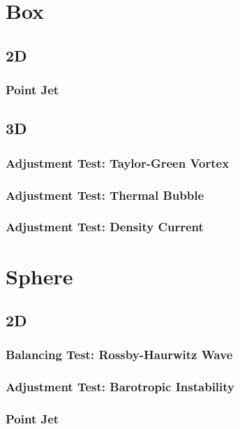 \documentclass{report}
\begin{document}
\section{Box}

\subsection{2D}

\subsubsection{Point Jet}

\subsection{3D}

\subsubsection{Adjustment Test: Taylor-Green Vortex}
\subsubsection{Adjustment Test: Thermal Bubble}
\subsubsection{Adjustment Test: Density Current}

\section{Sphere}

\subsection{2D}

\subsubsection{Balancing Test: Rossby-Haurwitz Wave}
\subsubsection{Adjustment Test: Barotropic Instability}
\subsubsection{Point Jet}
\end{document}
